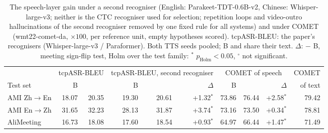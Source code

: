 \begin{table}[!t]
\centering\small
\setlength{\tabcolsep}{4pt}
\begin{tabular}{lrrrrrrrrr}
\toprule
 & \multicolumn{2}{c}{tcpASR-BLEU} & \multicolumn{3}{c}{tcpASR-BLEU, second recogniser} & \multicolumn{3}{c}{COMET of speech} & COMET \\
\cmidrule(lr){2-3}\cmidrule(lr){4-6}\cmidrule(lr){7-9}
Test set & B & \sys{} & B & \sys{} & $\Delta$ & B & \sys{} & $\Delta$ & of text \\
\midrule
AMI Zh$\rightarrow$En & 18.07 & 20.35 & 19.30 & 20.61 & +1.32$^{*}$ & 73.86 & 76.44 & +2.58$^{*}$ & 79.42 \\
AMI En$\rightarrow$Zh & 31.65 & 32.23 & 28.13 & 31.87 & +3.74$^{*}$ & 73.16 & 73.50 & +0.34$^{*}$ & 78.81 \\
AliMeeting & 16.73 & 18.08 & 17.60 & 18.54 & +0.93$^{*}$ & 64.97 & 66.44 & +1.47$^{*}$ & 71.49 \\
\bottomrule
\end{tabular}
\caption{The speech-layer gain under a second recogniser (English: Parakeet-TDT-0.6B-v2, Chinese: Whisper-large-v3; neither is the CTC recogniser used for selection; repetition loops and video-outro hallucinations of the second recogniser removed by one fixed rule for all systems) and under COMET (wmt22-comet-da, $\times100$, per reference unit, empty hypotheses scored). tcpASR-BLEU: the paper's recognisers (Whisper-large-v3 / Paraformer). Both TTS seeds pooled; B and \sys{} share their text. $\Delta$: \sys{} $-$ B, meeting sign-flip test, Holm over the test family: $^{*}$ $p_\text{Holm}<0.05$, $^{\circ}$ not significant.}
\label{tab:metricsv11}
\end{table}
